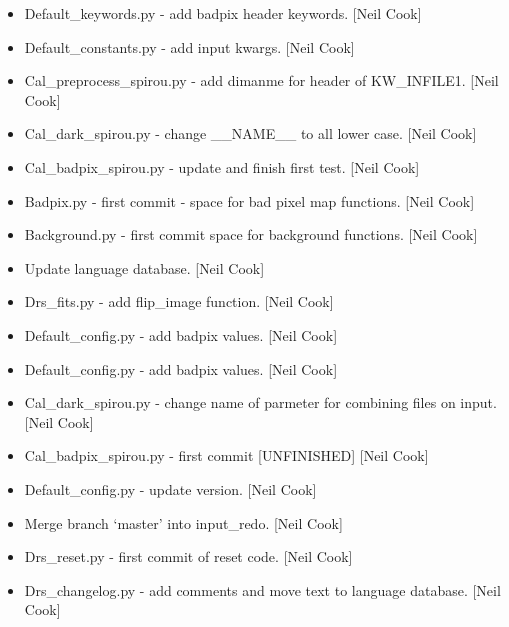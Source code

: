\documentclass[a4paper,10pt,english]{report}
\begin{document}
\begin{itemize}
\item {} 
Default\_keywords.py - add badpix header keywords. {[}Neil Cook{]}

\item {} 
Default\_constants.py - add input kwargs. {[}Neil Cook{]}

\item {} 
Cal\_preprocess\_spirou.py - add dimanme for header of KW\_INFILE1. {[}Neil
Cook{]}

\item {} 
Cal\_dark\_spirou.py - change \_\_NAME\_\_ to all lower case. {[}Neil Cook{]}

\item {} 
Cal\_badpix\_spirou.py - update and finish first test. {[}Neil Cook{]}

\item {} 
Badpix.py - first commit - space for bad pixel map functions. {[}Neil
Cook{]}

\item {} 
Background.py - first commit space for background functions. {[}Neil
Cook{]}

\item {} 
Update language database. {[}Neil Cook{]}

\item {} 
Drs\_fits.py - add flip\_image function. {[}Neil Cook{]}

\item {} 
Default\_config.py - add badpix values. {[}Neil Cook{]}

\item {} 
Default\_config.py - add badpix values. {[}Neil Cook{]}

\item {} 
Cal\_dark\_spirou.py - change name of parmeter for combining files on
input. {[}Neil Cook{]}

\item {} 
Cal\_badpix\_spirou.py - first commit {[}UNFINISHED{]} {[}Neil Cook{]}

\item {} 
Default\_config.py - update version. {[}Neil Cook{]}

\item {} 
Merge branch ‘master’ into input\_redo. {[}Neil Cook{]}

\item {} 
Drs\_reset.py - first commit of reset code. {[}Neil Cook{]}

\item {} 
Drs\_changelog.py - add comments and move text to language database.
{[}Neil Cook{]}


\end{itemize}
\end{document}
